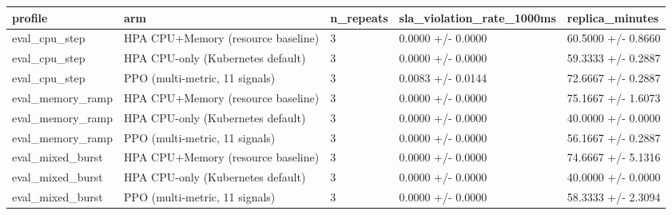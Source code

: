\begin{tabular}{lllll}
\hline
profile & arm & n\_repeats & sla\_violation\_rate\_1000ms & replica\_minutes \\
\hline
eval\_cpu\_step & HPA CPU+Memory (resource baseline) & 3 & 0.0000 +/- 0.0000 & 60.5000 +/- 0.8660 \\
eval\_cpu\_step & HPA CPU-only (Kubernetes default) & 3 & 0.0000 +/- 0.0000 & 59.3333 +/- 0.2887 \\
eval\_cpu\_step & PPO (multi-metric, 11 signals) & 3 & 0.0083 +/- 0.0144 & 72.6667 +/- 0.2887 \\
eval\_memory\_ramp & HPA CPU+Memory (resource baseline) & 3 & 0.0000 +/- 0.0000 & 75.1667 +/- 1.6073 \\
eval\_memory\_ramp & HPA CPU-only (Kubernetes default) & 3 & 0.0000 +/- 0.0000 & 40.0000 +/- 0.0000 \\
eval\_memory\_ramp & PPO (multi-metric, 11 signals) & 3 & 0.0000 +/- 0.0000 & 56.1667 +/- 0.2887 \\
eval\_mixed\_burst & HPA CPU+Memory (resource baseline) & 3 & 0.0000 +/- 0.0000 & 74.6667 +/- 5.1316 \\
eval\_mixed\_burst & HPA CPU-only (Kubernetes default) & 3 & 0.0000 +/- 0.0000 & 40.0000 +/- 0.0000 \\
eval\_mixed\_burst & PPO (multi-metric, 11 signals) & 3 & 0.0000 +/- 0.0000 & 58.3333 +/- 2.3094 \\
\hline
\end{tabular}

